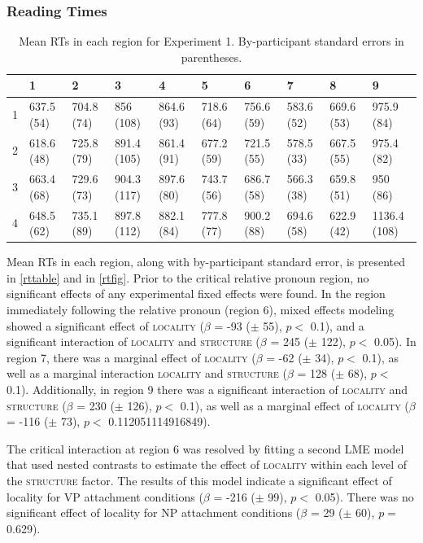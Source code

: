 \documentclass[12pt]{article}
\begin{document}
\subsubsection{Reading Times}
\label{sec:rts}

\begin{table}[ht]
\centering
{\scriptsize
\begin{tabularx}{\textwidth}{rlllllllll}
  \hline
 & 1 & 2 & 3 & 4 & 5 & 6 & 7 & 8 & 9 \\ 
  \hline
1 & 637.5 (54) & 704.8 (74) & 856 (108) & 864.6 (93) & 718.6 (64) & 756.6 (59) & 583.6 (52) & 669.6 (53) & 975.9 (84) \\ 
  2 & 618.6 (48) & 725.8 (79) & 891.4 (105) & 861.4 (91) & 677.2 (59) & 721.5 (55) & 578.5 (33) & 667.5 (55) & 975.4 (82) \\ 
  3 & 663.4 (68) & 729.6 (73) & 904.3 (117) & 897.6 (80) & 743.7 (56) & 686.7 (58) & 566.3 (38) & 659.8 (51) & 950 (86) \\ 
  4 & 648.5 (62) & 735.1 (89) & 897.8 (112) & 882.1 (84) & 777.8 (77) & 900.2 (88) & 694.6 (58) & 622.9 (42) & 1136.4 (108) \\ 
   \hline
\end{tabularx}
}
\caption{Mean RTs in each region for Experiment 1. By-participant standard errors in parentheses.} 
\end{table}
Mean RTs in each region, along with by-participant standard error, is presented in \ref{rttable} and in \ref{rtfig}. Prior to the critical relative pronoun region, no significant effects of any experimental fixed effects were found. In the region immediately following the relative pronoun (region 6), mixed effects modeling showed a significant effect of \textsc{locality} ($\beta$ = -93 ($\pm$ 55), $p <$ 0.1), and a significant interaction of \textsc{locality} and \textsc{structure} ($\beta$ = 245 ($\pm$ 122), $p <$ 0.05). In region 7, there was a marginal effect of \textsc{locality} ($\beta$ = -62 ($\pm$ 34), $p <$ 0.1), as well as a marginal interaction \textsc{locality} and \textsc{structure} ($\beta$ = 128 ($\pm$ 68), $p <$ 0.1). Additionally, in region 9 there was a significant interaction of \textsc{locality} and \textsc{structure} ($\beta$ = 230 ($\pm$ 126), $p <$ 0.1), as well as a marginal effect of \textsc{locality} ($\beta$ = -116 ($\pm$ 73), $p <$ 0.112051114916849).

The critical interaction at region 6 was resolved by fitting a second LME model that used nested contrasts to estimate the effect of \textsc{locality} within each level of the \textsc{structure} factor. The results of this model indicate a significant effect of locality for VP attachment conditions ($\beta$ = -216 ($\pm$ 99), $p <$ 0.05). There was no significant effect of locality for NP attachment conditions ($\beta$ = 29 ($\pm$ 60), $p =$ 0.629).
\end{document}
